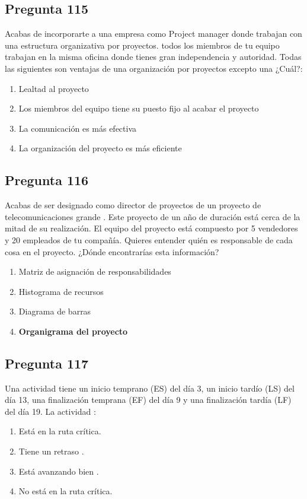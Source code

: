 \documentclass[11pt,a4paper]{article}
\begin{document}
\subsection*{Pregunta 115}
Acabas de incorporarte a una empresa como Project manager donde trabajan con una estructura organizativa por proyectos. todos los miembros de tu equipo trabajan en la misma oficina donde tienes gran independencia y autoridad. Todas las siguientes son ventajas de una organización por proyectos excepto una ¿Cuál?:

\begin{enumerate}[label=\alph*)]
  \item Lealtad al proyecto
  \item Los miembros del equipo tiene su puesto fijo al acabar el proyecto
  \item La comunicación es más efectiva
  \item La organización del proyecto es más eficiente
\end{enumerate}

\subsection*{Pregunta 116}
Acabas de ser designado como director de proyectos de un proyecto de telecomunicaciones grande . Este proyecto de un año de duración está cerca de la mitad de su realización. El equipo del proyecto está compuesto por 5 vendedores y 20 empleados de tu compañía. Quieres entender quién es responsable de cada cosa en el proyecto. ¿Dónde encontrarías esta información?

\begin{enumerate}[label=\alph*)]
  \item Matriz de asignación de responsabilidades
  \item Histograma de recursos
  \item Diagrama de barras
  \item \textbf{Organigrama del proyecto}
\end{enumerate}

\subsection*{Pregunta 117}
Una actividad tiene un inicio temprano (ES) del día 3, un inicio tardío (LS) del día 13, una finalización temprana (EF) del día 9 y una finalización tardía (LF) del día 19. La actividad :

\begin{enumerate}[label=\alph*)]
  \item Está en la ruta crítica.
  \item Tiene un retraso .
  \item Está avanzando bien .
  \item No está en la ruta crítica.
\end{enumerate}
\end{document}
